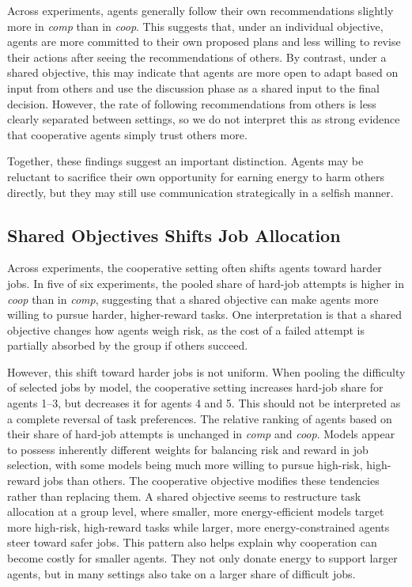 \documentclass[sigconf,nonacm]{acmart}
\begin{document}
Across experiments, agents generally follow their own recommendations slightly more in \textit{comp} than in \textit{coop}. This suggests that, under an individual objective, agents are more committed to their own proposed plans and less willing to revise their actions after seeing the recommendations of others. 
By contrast, under a shared objective, this may indicate that agents are more open to adapt based on input from others and use the discussion phase as a shared input to the final decision. However, the rate of following recommendations from others is less clearly separated between settings, so we do not interpret this as strong evidence that cooperative agents simply trust others more.

Together, these findings suggest an important distinction. Agents may be reluctant to sacrifice their own opportunity for earning energy to harm others directly, but they may still use communication strategically in a selfish manner.

\subsection{Shared Objectives Shifts Job Allocation}
Across experiments, the cooperative setting often shifts agents toward harder jobs. In five of six experiments, the pooled share of hard-job attempts is higher in \textit{coop} than in \textit{comp}, suggesting that a shared objective can make agents more willing to pursue harder, higher-reward tasks.
One interpretation is that a shared objective changes how agents weigh risk, as the cost of a failed attempt is partially absorbed by the group if others succeed.

However, this shift toward harder jobs is not uniform. When pooling the difficulty of selected jobs by model, the cooperative setting increases hard-job share for agents 1--3, but decreases it for agents 4 and 5. This should not be interpreted as a complete reversal of task preferences. The relative ranking of agents based on their share of hard-job attempts is unchanged in \textit{comp} and \textit{coop}.
Models appear to possess inherently different weights for balancing risk and reward in job selection, with some models being much more willing to pursue high-risk, high-reward jobs than others.
The cooperative objective modifies these tendencies rather than replacing them. 
A shared objective seems to restructure task allocation at a group level, where smaller, more energy-efficient models target more high-risk, high-reward tasks while larger, more energy-constrained agents steer toward safer jobs.
This pattern also helps explain why cooperation can become costly for smaller agents. They not only donate energy to support larger agents, but in many settings also take on a larger share of difficult jobs.
\end{document}
